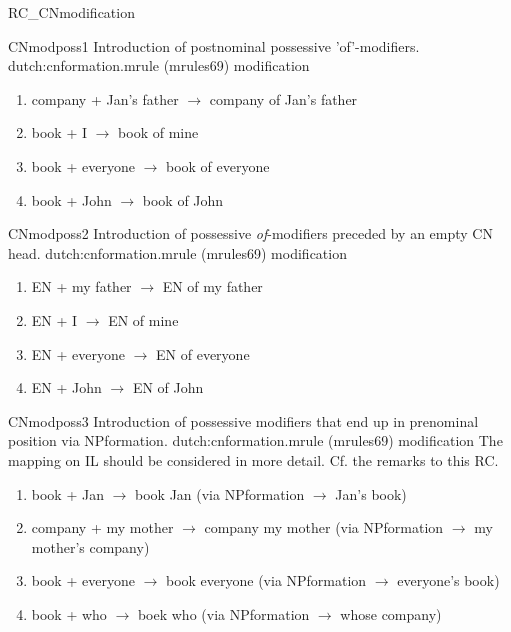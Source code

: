 \begin{mruleclass}{RC\_CNmodification}
\begin{members}
\begin{member}
\end{member}
\begin{member}
 CNmodposs1
Introduction of postnominal possessive 'of'-modifiers.
\file dutch:cnformation.mrule (mrules69)
\semantics modification
\example
\begin{enumerate}
  \item
 company + Jan's father $\rightarrow$ company of Jan's father
  \item 
 book + I $\rightarrow$ book of mine
  \item
 book + everyone $\rightarrow$ book of everyone
  \item 
 book + John $\rightarrow$ book of John
\end{enumerate}
\remarks\mbox{}
\end{member}
\begin{member}
 CNmodposs2
Introduction of possessive {\em of}-modifiers preceded by an empty CN head.
\file dutch:cnformation.mrule (mrules69)
\semantics modification
\remarks\mbox{}
\example  
\begin{enumerate}
\item
EN + my father $\rightarrow$ EN of my father
\item
EN + I $\rightarrow$ EN of mine
\item
EN + everyone $\rightarrow$ EN of everyone
\item
 EN + John $\rightarrow$ EN of John
\end{enumerate}

\end{member}
\begin{member}
 CNmodposs3
Introduction of possessive modifiers that end up in prenominal position
via NPformation.
\file dutch:cnformation.mrule (mrules69)
\semantics modification
\remarks\mbox{}
The mapping on IL should be considered in more detail. Cf. the remarks to
this RC.
\example\
\begin{enumerate}
  \item 
book + Jan $\rightarrow$ book Jan
(via NPformation $\rightarrow$ Jan's book)
\item 
company + my mother $\rightarrow$ company my mother
(via NPformation $\rightarrow$ my mother's company)
  \item
book + everyone $\rightarrow$ book everyone
(via NPformation $\rightarrow$ everyone's book)
\item 
book + who $\rightarrow$ boek who
(via NPformation $\rightarrow$ whose company)
\end{enumerate}


\end{member}
\end{members}
\end{mruleclass}
